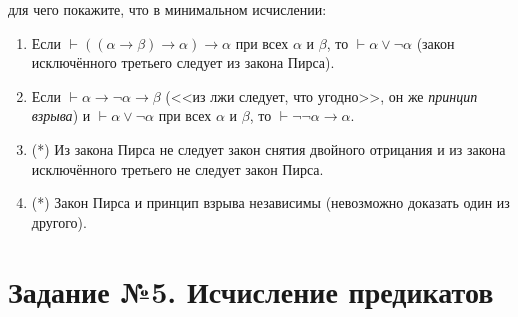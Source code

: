 \documentclass[10pt,a4paper,oneside]{article}
\begin{document}
\begin{enumerate}
для чего покажите, что в минимальном исчислении:
\begin{enumerate}
\item Если $\vdash((\alpha\rightarrow\beta)\rightarrow\alpha)\rightarrow\alpha$ при всех $\alpha$ и $\beta$, то
$\vdash\alpha\vee\neg\alpha$ (закон исключённого третьего следует из закона Пирса).
\item Если $\vdash\alpha\rightarrow\neg\alpha\rightarrow\beta$ (<<из лжи следует, что угодно>>, 
он же \emph{принцип взрыва}) и $\vdash\alpha\vee\neg\alpha$ при всех $\alpha$ и $\beta$, то $\vdash\neg\neg\alpha\rightarrow\alpha$.
\item (*) Из закона Пирса не следует закон снятия двойного отрицания и из закона исключённого третьего не следует закон Пирса.
\item (*) Закон Пирса и принцип взрыва независимы (невозможно доказать один из другого).
\end{enumerate}

\end{enumerate}

\section*{Задание №5. Исчисление предикатов}
\end{document}
